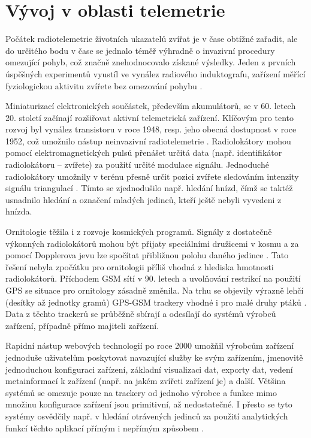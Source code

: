 \section{Vývoj v oblasti telemetrie}

Počátek radiotelemetrie životních ukazatelů zvířat je v čase obtížné zařadit, ale do určitého bodu v čase se jednalo téměř výhradně o invazivní procedury omezující pohyb, což značně znehodnocovalo získané výsledky. Jeden z prvních úspěšných experimentů vyustíl ve vynález radiového induktografu, zařízení měřící fyziologickou aktivitu zvířete bez omezování pohybu \cite{fuller1948radio}.

Miniaturizací elektronických součástek, především akumulátorů, se v 60. letech 20. století začínají rozšiřovat aktivní telemetrická zařízení. Klíčovým pro tento rozvoj byl vynález transistoru v roce 1948, resp. jeho obecná dostupnost v roce 1952, což umožnilo nástup neinvazivní radiotelemetrie \cite{amlaner2013handbook}. Radiolokátory mohou pomocí elektromagnetických pulsů přenášet určitá data (např. identifikátor radiolokátoru -- zvířete) za použití určité modulace signálu. Jednoduché radiolokátory umožnily v terénu přesně určit pozici zvířete sledováním intenzity signálu triangulací \cite{Farve2014}. Tímto se zjednodušilo např. hledání hnízd, čímž se taktéž usnadnilo hledání a označení mladých jedinců, kteří ještě nebyli vyvedeni z hnízda.


Ornitologie těžila i z rozvoje kosmických programů. Signály z dostatečně výkonných radiolokátorů mohou být přijaty speciálními družicemi v kosmu a za pomocí Dopplerova jevu lze spočítat přibližnou polohu daného jedince \cite{Farve2014}. Tato řešení nebyla zpočátku pro ornitologii příliš vhodná z hlediska hmotnosti radiolokátorů. Příchodem GSM sítí v 90. letech a uvolňování restrikcí na použití GPS se situace pro ornitology zásadně změnila. Na trhu se objevily výrazně lehčí (desítky až jednotky gramů) GPS-GSM trackery vhodné i pro malé druhy ptáků \cite{sokolov2011modern}. Data z těchto trackerů se průběžně sbírají a odesílají do systémů výrobců zařízení, případně přímo majiteli zařízení.

Rapidní nástup webových technologií po roce 2000 umožňil výrobcům zařízení jednoduše uživatelům poskytovat navazující služby ke svým zařízením, jmenovitě jednoduchou konfiguraci zařízení, základní visualizaci dat, exporty dat, vedení metainformací k zařízení (např. na jakém zvířeti zařízení je) a další. Většina systémů se omezuje pouze na trackery od jednoho výrobce a funkce mimo množinu konfigurace zařízení jsou primitivní, až nedostatečné. I přesto se tyto systémy osvědčily např. v hledání otrávených jedinců za použití analytických funkcí těchto aplikací přímým i nepřímým způsobem \cite{stoynov2018early}.

